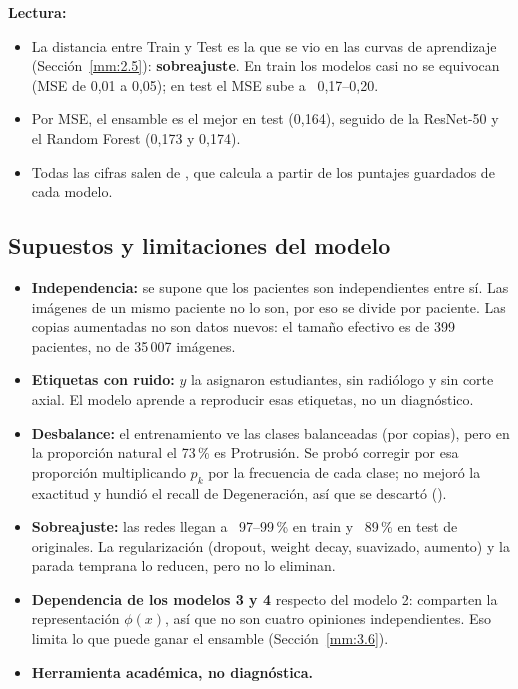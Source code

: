 \textbf{Lectura:}
\begin{itemize}
  \item La distancia entre Train y Test es la que se vio en las curvas de aprendizaje (Sección~\ref{mm:2.5}): \textbf{sobreajuste}. En train los modelos casi no se equivocan (MSE de 0,01 a 0,05); en test el MSE sube a ~0,17–0,20.
  \item Por MSE, el ensamble es el mejor en test (0,164), seguido de la ResNet-50 y el Random Forest (0,173 y 0,174).
  \item Todas las cifras salen de , que  calcula a partir de los puntajes guardados de cada modelo.
\end{itemize}


\subsection{Supuestos y limitaciones del modelo}
\label{mm:5}
\begin{itemize}
  \item \textbf{Independencia:} se supone que los pacientes son independientes entre sí. Las imágenes de un mismo paciente no lo son, por eso se divide por paciente. Las copias aumentadas no son datos nuevos: el tamaño efectivo es de 399 pacientes, no de 35\,007 imágenes.
  \item \textbf{Etiquetas con ruido:} $y$ la asignaron estudiantes, sin radiólogo y sin corte axial. El modelo aprende a reproducir esas etiquetas, no un diagnóstico.
  \item \textbf{Desbalance:} el entrenamiento ve las clases balanceadas (por copias), pero en la proporción natural el 73\,\% es Protrusión. Se probó corregir por esa proporción multiplicando $p_k$ por la frecuencia de cada clase; no mejoró la exactitud y hundió el recall de Degeneración, así que se descartó ().
  \item \textbf{Sobreajuste:} las redes llegan a ~97–99\,\% en train y ~89\,\% en test de originales. La regularización (dropout, weight decay, suavizado, aumento) y la parada temprana lo reducen, pero no lo eliminan.
  \item \textbf{Dependencia de los modelos 3 y 4} respecto del modelo 2: comparten la representación $\phi(x)$, así que no son cuatro opiniones independientes. Eso limita lo que puede ganar el ensamble (Sección~\ref{mm:3.6}).
  \item \textbf{Herramienta académica, no diagnóstica.}
\end{itemize}

